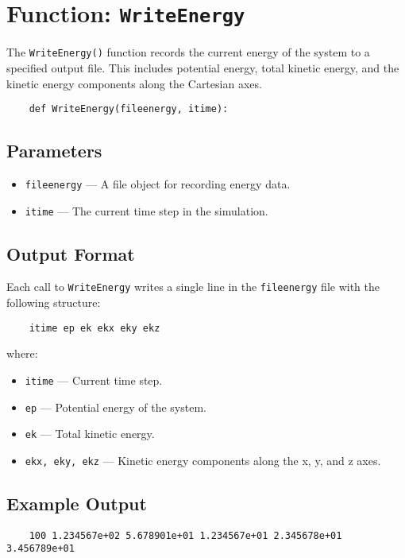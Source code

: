 \documentclass[12pt, ngerman]{report}
\begin{document}
\section{Function: \texttt{WriteEnergy}}
\label{sec:writeenergy}

The \texttt{WriteEnergy()} function records the current energy of the system to a specified output file. This includes potential energy, total kinetic energy, and the kinetic energy components along the Cartesian axes.

\begin{verbatim}
	def WriteEnergy(fileenergy, itime):
\end{verbatim}

\subsection*{Parameters}
\begin{itemize}
	\item \texttt{fileenergy} --- A file object for recording energy data.
	\item \texttt{itime} --- The current time step in the simulation.
\end{itemize}

\subsection*{Output Format}
Each call to \texttt{WriteEnergy} writes a single line in the \texttt{fileenergy} file with the following structure:
\begin{verbatim}
	itime ep ek ekx eky ekz
\end{verbatim}
where:
\begin{itemize}
	\item \texttt{itime} --- Current time step.
	\item \texttt{ep} --- Potential energy of the system.
	\item \texttt{ek} --- Total kinetic energy.
	\item \texttt{ekx, eky, ekz} --- Kinetic energy components along the x, y, and z axes.
\end{itemize}

\subsection*{Example Output}
\begin{verbatim}
	100 1.234567e+02 5.678901e+01 1.234567e+01 2.345678e+01 3.456789e+01
\end{verbatim}
\end{document}
